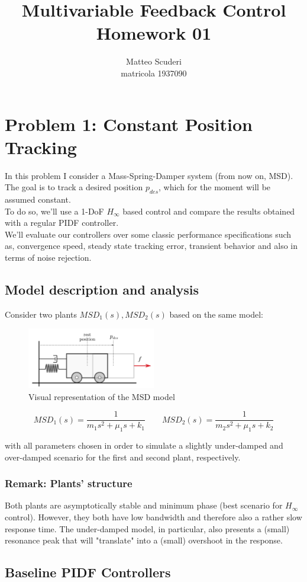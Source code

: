 \documentclass[a4paper, 12pt]{article}
\title{Multivariable Feedback Control \\ Homework 01}
\author{Matteo Scuderi\\ matricola 1937090}
\date{}
\def\FigureOne{\centering\includegraphics[width=0.5\textwidth]{Figures/fig01.pdf}}
\begin{document}
\maketitle

\section{Problem 1: Constant Position Tracking}

In this problem I consider a Mass-Spring-Damper system (from now on, MSD). The goal is to track a desired position $p_{des}$, which for the moment will be assumed constant.\\
To do so, we'll use a 1-DoF $H_\infty$ based control and compare the results obtained with a regular PIDF controller.\\
We'll evaluate our controllers over some classic performance specifications such as, convergence speed, steady state tracking error, transient behavior and  also in terms of noise rejection.

\subsection{Model description and analysis}
\label{sec:ModelDescription}
Consider two plants $MSD_1(s), MSD_2(s)$ based on the same model:
\begin{figure}[h!]
    \FigureOne
    \caption{Visual representation of the MSD model}
    \label{fig:fig01}
\end{figure}

\begin{equation}
        MSD_1(s) = \frac{1}{m_1 s^2 + \mu_1 s + k_1} \qquad  MSD_2(s) = \frac{1}{m_2 s^2 + \mu_1 s + k_2}
\label{eq:Model}
\end{equation}

with all parameters chosen in order to simulate a slightly under-damped and over-damped scenario for the first and second plant, respectively.
\subsubsection*{Remark: Plants' structure}
Both plants are asymptotically stable and minimum phase (best scenario for $H_\infty$ control). However, they both have low bandwidth and therefore also a rather slow response time. The under-damped model, in particular, also presents a (small) resonance peak that will "translate" into a (small) overshoot in the response.
\subsection{Baseline PIDF Controllers}
\label{sec:PIDControllers}
\end{document}
